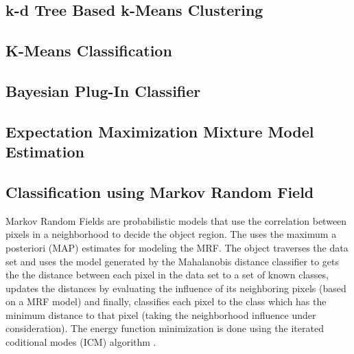 \subsection{k-d Tree Based k-Means Clustering}
\label{sec:KdTreeBasedKMeansClustering}
\ifitkFullVersion

\fi

\subsection{K-Means Classification}
\label{sec:KMeansClassifier}
\ifitkFullVersion

\fi

\subsection{Bayesian Plug-In Classifier}
\label{sec:BayesianPluginClassifier}

\ifitkFullVersion 

\fi


\subsection{Expectation Maximization Mixture Model Estimation}
\label{sec:ExpectationMaximizationMixtureModelEstimation}

\ifitkFullVersion 

\fi

\subsection{Classification using Markov Random Field}
\label{sec:MarkovRandomField}

Markov Random Fields are probabilistic models that use the correlation between pixels in a neighborhood to decide the object region. The  uses the maximum a posteriori (MAP) estimates for modeling the MRF. The object traverses the data set and uses the model 
  generated by the Mahalanobis distance classifier to gets the the distance  
  between each pixel in the data set to a set of known classes, updates the 
  distances by evaluating the influence of its neighboring pixels (based 
  on a MRF model) and finally, classifies each pixel to the class 
  which has the minimum distance to that pixel (taking the neighborhood 
  influence under consideration). The energy function minimization is done using the iterated coditional modes (ICM) algorithm \cite{Besag1986}.

\ifitkFullVersion

\fi 




